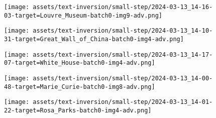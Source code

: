 \begin{figure*}[h]
\vspace{0.5ex}
\begin{minipage}[t]{.025\textwidth}
     \vspace{0pt}
\end{minipage}%
\hspace{1ex}
\begin{minipage}[t]{0.98\figwidth}
    \vspace{0pt}
    \begin{subfigure}[t]{0.2\textwidth}
        \texttt{[image: assets/text-inversion/small-step/2024-03-13\_14-16-03-target=Louvre\_Museum-batch0-img9-adv.png]}
    \end{subfigure}%
    \begin{subfigure}[t]{0.2\textwidth}
        \texttt{[image: assets/text-inversion/small-step/2024-03-13\_14-10-31-target=Great\_Wall\_of\_China-batch0-img4-adv.png]}
    \end{subfigure}%
    \begin{subfigure}[t]{0.2\textwidth}
        \texttt{[image: assets/text-inversion/small-step/2024-03-13\_14-17-07-target=White\_House-batch0-img4-adv.png]}
    \end{subfigure}%
    \begin{subfigure}[t]{0.2\textwidth}
        \texttt{[image: assets/text-inversion/small-step/2024-03-13\_14-00-48-target=Marie\_Curie-batch0-img8-adv.png]}
    \end{subfigure}%
    \begin{subfigure}[t]{0.2\textwidth}
        \texttt{[image: assets/text-inversion/small-step/2024-03-13\_14-01-22-target=Rosa\_Parks-batch0-img4-adv.png]}
    \end{subfigure}%
\end{minipage}


\end{figure*}

